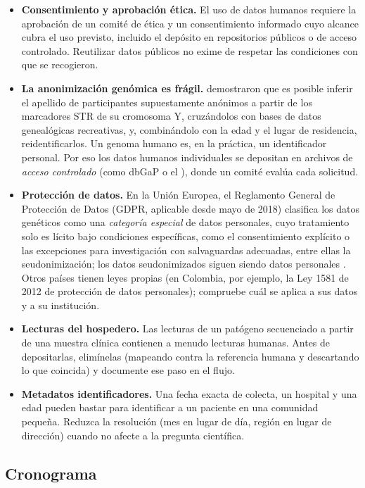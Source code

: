 \begin{itemize}
  \item \textbf{Consentimiento y aprobación ética.} El uso de datos humanos requiere la aprobación de un comité de ética y un consentimiento informado cuyo alcance cubra el uso previsto, incluido el depósito en repositorios públicos o de acceso controlado. Reutilizar datos públicos no exime de respetar las condiciones con que se recogieron.
  \item \textbf{La anonimización genómica es frágil.} \textcite{c18-gymrek2013} demostraron que es posible inferir el apellido de participantes supuestamente anónimos a partir de los marcadores STR de su cromosoma Y, cruzándolos con bases de datos genealógicas recreativas, y, combinándolo con la edad y el lugar de residencia, reidentificarlos. Un genoma humano es, en la práctica, un identificador personal. Por eso los datos humanos individuales se depositan en archivos de \emph{acceso controlado} (como dbGaP o el ), donde un comité evalúa cada solicitud.
  \item \textbf{Protección de datos.} En la Unión Europea, el Reglamento General de Protección de Datos (GDPR, aplicable desde mayo de 2018) clasifica los datos genéticos como una \emph{categoría especial} de datos personales, cuyo tratamiento solo es lícito bajo condiciones específicas, como el consentimiento explícito o las excepciones para investigación con salvaguardas adecuadas, entre ellas la seudonimización; los datos seudonimizados siguen siendo datos personales \parencite{c18-shabani2018}. Otros países tienen leyes propias (en Colombia, por ejemplo, la Ley 1581 de 2012 de protección de datos personales); compruebe cuál se aplica a sus datos y a su institución.
  \item \textbf{Lecturas del hospedero.} Las lecturas de un patógeno secuenciado a partir de una muestra clínica contienen a menudo lecturas humanas. Antes de depositarlas, elimínelas (mapeando contra la referencia humana y descartando lo que coincida) y documente ese paso en el flujo.
  \item \textbf{Metadatos identificadores.} Una fecha exacta de colecta, un hospital y una edad pueden bastar para identificar a un paciente en una comunidad pequeña. Reduzca la resolución (mes en lugar de día, región en lugar de dirección) cuando no afecte a la pregunta científica.
\end{itemize}

\subsection{Cronograma}


